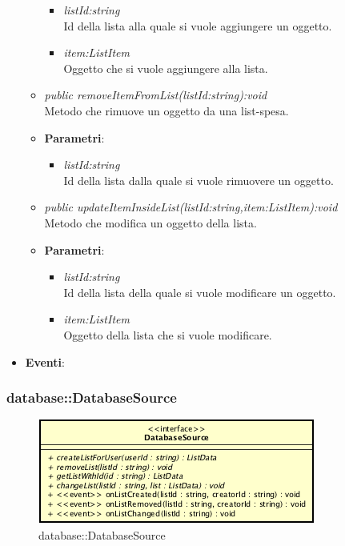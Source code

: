 \begin{itemize}
\begin{itemize}
{\begin{itemize}
			\item \textit{listId:string}\\
			Id della lista alla quale si vuole aggiungere un oggetto.
			\item \textit{item:ListItem}\\
			Oggetto che si vuole aggiungere alla lista.
			\end{itemize}}
	\item \textit{public removeItemFromList(listId:string):void}\\
	Metodo che rimuove un oggetto da una list-spesa.
			\item{\textbf{Parametri}: \begin{itemize}
			\item \textit{listId:string}\\
			Id della lista dalla quale si vuole rimuovere un oggetto.
			\end{itemize}}
	\item \textit{public updateItemInsideList(listId:string,item:ListItem):void}\\
	Metodo che modifica un oggetto della lista.
			\item{\textbf{Parametri}: \begin{itemize}
			\item \textit{listId:string}\\
			Id della lista della quale si vuole modificare un oggetto.
			\item \textit{item:ListItem}\\
			Oggetto della lista che si vuole modificare.
			\end{itemize}}
	\end{itemize}
\item \textbf{Eventi}:
\end{itemize}

\subsubsection{database::DatabaseSource}

\label{database::DatabaseSource}
\begin{figure}[ht]
	\centering
	\includegraphics[scale=0.5]{Sezioni/SottosezioniST/img/app/DatabaseSource.png}
	\caption{database::DatabaseSource}
\end{figure}

